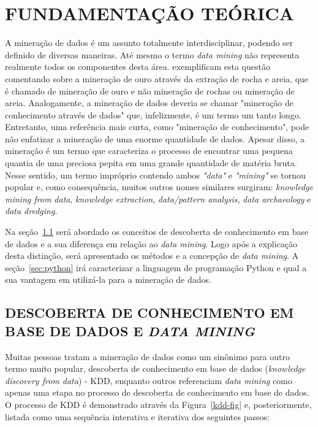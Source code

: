 \chapter{FUNDAMENTAÇÃO TEÓRICA}\label{ch:fundaments-teorico}
A mineração de dados é um assunto totalmente interdisciplinar, podendo ser definido de diversas maneiras. Até mesmo o termo \textit{data mining} não representa realmente todos os componentes desta área.  exemplificam esta questão comentando sobre a mineração de ouro através da extração de rocha e areia, que é chamado de mineração de ouro e não mineração de rochas ou mineração de areia. Analogamente, a mineração de dados deveria se chamar "mineração de conhecimento através de dados" \space que, infelizmente, é um termo um tanto longo. Entretanto, uma referência mais curta, como "mineração de conhecimento", pode não enfatizar a mineração de uma enorme quantidade de dados. Apesar disso, a mineração é um termo que caracteriza o processo de encontrar uma pequena quantia de uma preciosa pepita em uma grande quantidade de matéria bruta. Nesse sentido, um termo impróprio contendo ambos \textit{"data"} e \textit{"mining"} se tornou popular e, como consequência, muitos outros nomes similares surgiram: \textit{knowledge mining from data}, \textit{knowledge extraction}, \textit{data/pattern analysis}, \textit{data archaeology} e \textit{data dredging}.

Na seção~\ref{sec:kdd} será abordado os conceitos de descoberta de conhecimento em base de dados e a sua diferença em relação ao \textit{data mining}. Logo após a explicação desta distinção, será apresentado os métodos e a concepção de \textit{data mining}. A seção~\ref{sec:python} irá caracterizar a linguagem de programação Python e qual a sua vantagem em utilizá-la para a mineração de dados.

\section{DESCOBERTA DE CONHECIMENTO EM BASE DE DADOS E \textit{DATA MINING}}\label{sec:kdd}
Muitas pessoas tratam a mineração de dados como um sinônimo para outro termo muito popular, descoberta de conhecimento em base de dados (\textit{knowledge discovery from data}) - KDD, enquanto outros referenciam \textit{data mining} como apenas uma etapa no processo de descoberta de conhecimento em base de dados. O processo de KDD é demonstrado através da  Figura~\ref{kdd-fig} e, posteriormente, listada como uma sequência interativa e iterativa dos seguintes passos: \\ \\ \\ \\ \\ \\ \\

